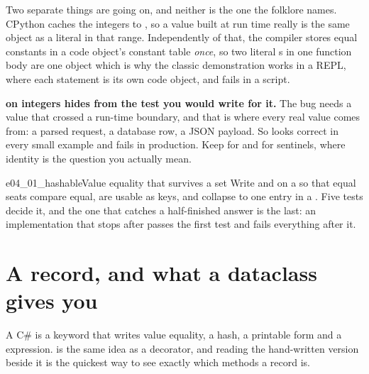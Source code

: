 
\noindent
Two separate things are going on, and neither is the one the folklore
names. CPython caches the integers  to , so a value
built at run time really is the same object as a literal in that range.
Independently of that, the compiler stores equal constants in a code
object's constant table \emph{once}, so two literal s in one
function body are one object \dash{} which is why the classic
demonstration works in a REPL, where each statement is its own code object,
and fails in a script.

\begin{trapbox}
\textbf{ on integers hides from the test you would write for it.}
The bug needs a value that crossed a run-time boundary, and that is where
every real value comes from: a parsed request, a database row, a JSON
payload. So  looks correct in every small example and fails in
production. Keep  for  and for sentinels, where
identity is the question you actually mean.
\end{trapbox}

\begin{exercise}{e04_01_hashable}{Value equality that survives a set}
Write  and  on a  so that
equal seats compare equal, are usable as  keys, and collapse to
one entry in a . Five tests decide it, and the one that catches a
half-finished answer is the last: an implementation that stops after
 passes the first test and fails everything after it.
\end{exercise}

\section{A record, and what a dataclass gives you}
\label{sec:ch04-dataclass}

A C\#  is a keyword that writes value equality, a hash, a
printable form and a  expression.  is the same
idea as a decorator, and reading the hand-written version beside it is the
quickest way to see exactly which methods a record is.


